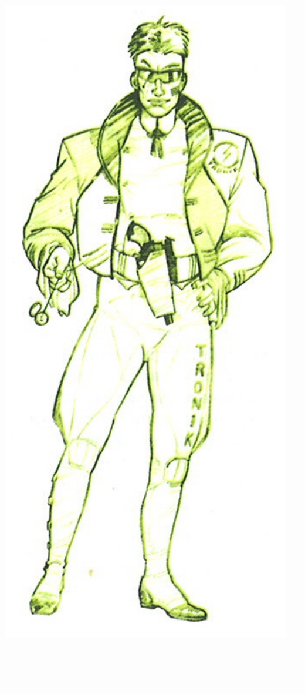 \documentclass[40pt,twoside,a4paper]{article}
\begin{document}
\begin{minipage}[ht]{0.15\textwidth}
	\includegraphics[width=0.95\textwidth]{../img/personnageJeremiahSteel.jpg} ~\\~\\
\end{minipage} ~\\

\hrule



\hrule

~\\
\end{document}
